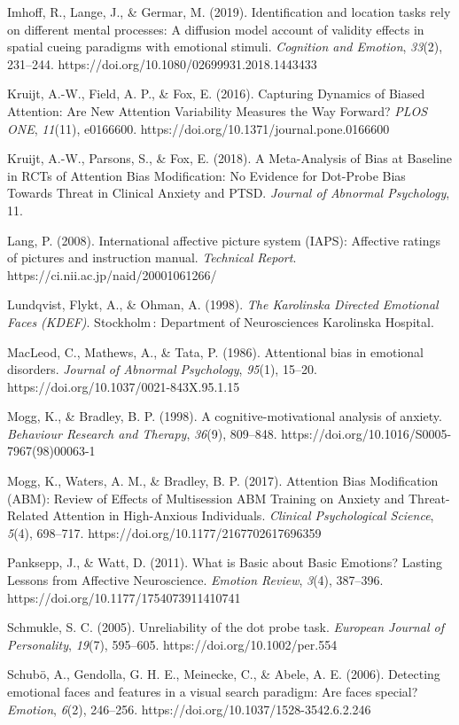\documentclass{article}
\begin{document}
Imhoff, R., Lange, J., \& Germar, M. (2019). Identification and location tasks rely on different mental processes: A diffusion model account of validity effects in spatial cueing paradigms with emotional stimuli. \emph{Cognition and Emotion}, \emph{33}(2), 231--244. https://doi.org/10.1080/02699931.2018.1443433

Kruijt, A.-W., Field, A. P., \& Fox, E. (2016). Capturing Dynamics of Biased Attention: Are New Attention Variability Measures the Way Forward? \emph{PLOS ONE}, \emph{11}(11), e0166600. https://doi.org/10.1371/journal.pone.0166600

Kruijt, A.-W., Parsons, S., \& Fox, E. (2018). A Meta-Analysis of Bias at Baseline in RCTs of Attention Bias Modification: No Evidence for Dot-Probe Bias Towards Threat in Clinical Anxiety and PTSD. \emph{Journal of Abnormal Psychology}, 11.

Lang, P. (2008). International affective picture system (IAPS): Affective ratings of pictures and instruction manual. \emph{Technical Report}. https://ci.nii.ac.jp/naid/20001061266/

Lundqvist, Flykt, A., \& Ohman, A. (1998). \emph{The Karolinska Directed Emotional Faces (KDEF)}. Stockholm : Department of Neurosciences Karolinska Hospital.

MacLeod, C., Mathews, A., \& Tata, P. (1986). Attentional bias in emotional disorders. \emph{Journal of Abnormal Psychology}, \emph{95}(1), 15--20. https://doi.org/10.1037/0021-843X.95.1.15

Mogg, K., \& Bradley, B. P. (1998). A cognitive-motivational analysis of anxiety. \emph{Behaviour Research and Therapy}, \emph{36}(9), 809--848. https://doi.org/10.1016/S0005-7967(98)00063-1

Mogg, K., Waters, A. M., \& Bradley, B. P. (2017). Attention Bias Modification (ABM): Review of Effects of Multisession ABM Training on Anxiety and Threat-Related Attention in High-Anxious Individuals. \emph{Clinical Psychological Science}, \emph{5}(4), 698--717. https://doi.org/10.1177/2167702617696359

Panksepp, J., \& Watt, D. (2011). What is Basic about Basic Emotions? Lasting Lessons from Affective Neuroscience. \emph{Emotion Review}, \emph{3}(4), 387--396. https://doi.org/10.1177/1754073911410741

Schmukle, S. C. (2005). Unreliability of the dot probe task. \emph{European Journal of Personality}, \emph{19}(7), 595--605. https://doi.org/10.1002/per.554

Schubö, A., Gendolla, G. H. E., Meinecke, C., \& Abele, A. E. (2006). Detecting emotional faces and features in a visual search paradigm: Are faces special? \emph{Emotion}, \emph{6}(2), 246--256. https://doi.org/10.1037/1528-3542.6.2.246
\end{document}
